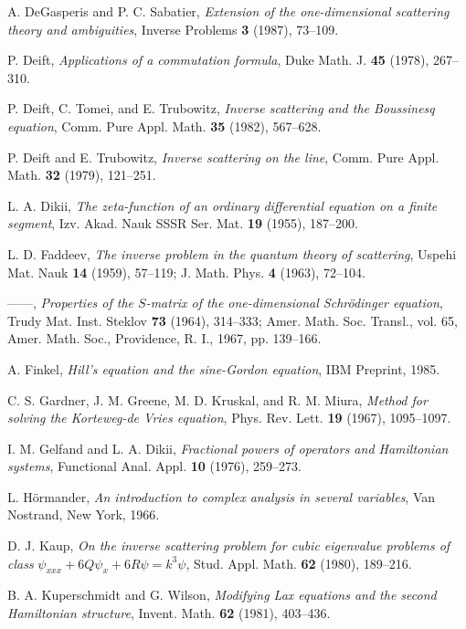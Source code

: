\documentclass{surv-l}
\theoremstyle{plain}
\theoremstyle{definition}
\numberwithin{equation}{chapter}
\begin{document}
\begin{thebibliography}{AKNS}
 A. DeGasperis and P. C. Sabatier, \emph{Extension of the one-dimensional scattering theory and ambiguities}, Inverse Problems \textbf{3} (1987), 73--109.

 P. Deift, \emph{Applications of a commutation formula}, Duke Math. J. \textbf{45} (1978), 267--310.

 P. Deift, C. Tomei, and E. Trubowitz, \emph{Inverse scattering and the Boussinesq equation}, Comm. Pure Appl. Math. \textbf{35} (1982), 567--628.

 P. Deift and E. Trubowitz, \emph{Inverse scattering on the line}, Comm. Pure Appl. Math. \textbf{32} (1979), 121--251.

 L. A. Dikii, \emph{The zeta-function of an ordinary differential equation on a finite segment}, Izv. Akad. Nauk SSSR Ser. Mat. \textbf{19} (1955), 187--200.

 L. D. Faddeev, \emph{The inverse problem in the quantum theory of scattering}, Uspehi Mat. Nauk \textbf{14} (1959), 57--119; J. Math. Phys. \textbf{4} (1963), 72--104.

 ------, \emph{Properties of the $S$-matrix of the one-dimensional Schr\"{o}dinger equation}, Trudy Mat. Inst. Steklov \textbf{73} (1964), 314--333; Amer. Math. Soc. Transl., vol. 65, Amer. Math. Soc., Providence, R. I., 1967, pp. 139--166.

 A. Finkel, \emph{Hill's equation and the sine-Gordon equation}, IBM Preprint, 1985.

 C. S. Gardner, J. M. Greene, M. D. Kruskal, and R. M. Miura, \emph{Method for solving the Korteweg-de Vries equation}, Phys. Rev. Lett. \textbf{19} (1967), 1095--1097.

 I. M. Gelfand and L. A. Dikii, \emph{Fractional powers of operators and Hamiltonian systems}, Functional Anal. Appl. \textbf{10} (1976), 259--273.

 L. H\"{o}rmander, \emph{An introduction to complex analysis in several variables}, Van Nostrand, New York, 1966.

 D. J. Kaup, \emph{On the inverse scattering problem for cubic eigenvalue problems of class} $\psi_{xxx}+6Q\psi_{x}+6R\psi=k^{3}\psi$, Stud. Appl. Math. \textbf{62} (1980), 189--216.

 B. A. Kuperschmidt and G. Wilson, \emph{Modifying Lax equations and the second Hamiltonian structure}, Invent. Math. \textbf{62} (1981), 403--436.


\end{thebibliography}
\end{document}
